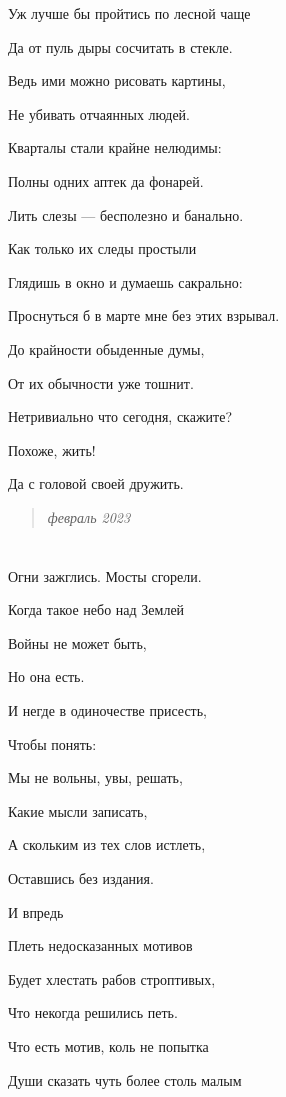 \documentclass[
  a5paperpaper,
  DIV=11,
  numbers=noendperiod]{scrreprt}
\begin{document}
Уж лучше бы пройтись по лесной чаще

Да от пуль дыры сосчитать в стекле.

Ведь ими можно рисовать картины,

Не убивать отчаянных людей.

Кварталы стали крайне нелюдимы:

Полны одних аптек да фонарей.

Лить слезы --- бесполезно и банально.

Как только их следы простыли

Глядишь в окно и думаешь сакрально:

Проснуться б в марте мне без этих взрывал.

До крайности обыденные думы,

От их обычности уже тошнит.

Нетривиально что сегодня, скажите?

Похоже, жить!

Да с головой своей дружить.

\begin{quote}
\emph{февраль 2023}
\end{quote}

\section*{}\label{section-18}

\markright{}

Огни зажглись. Мосты сгорели.

Когда такое небо над Землей

Войны не может быть,

Но она есть.

И негде в одиночестве присесть,

Чтобы понять:

Мы не вольны, увы, решать,

Какие мысли записать,

А скольким из тех слов истлеть,

Оставшись без издания.

И впредь

Плеть недосказанных мотивов

Будет хлестать рабов строптивых,

Что некогда решились петь.

Что есть мотив, коль не попытка

Души сказать чуть более столь малым
\end{document}

